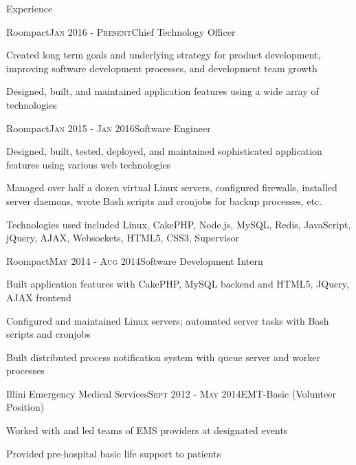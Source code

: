 \documentclass{resume} %
\begin{document}

\begin{rSection}{Experience}
\begin{rSubsection}{Roompact}{\textsc{Jan 2016 - Present}}{Chief Technology Officer}{}
\item Created long term goals and underlying strategy for product development, improving software development processes, and development team growth
\item Designed, built, and maintained application features using a wide array of technologies
\end{rSubsection}


\begin{rSubsection}{Roompact}{\textsc{Jan 2015 - Jan 2016}}{Software Engineer}{}
\item Designed, built, tested, deployed, and maintained sophisticated application features using various web technologies
\item Managed over half a dozen virtual Linux servers, configured firewalls, installed server daemons, wrote Bash scripts and cronjobs for backup processes, etc.
\item Technologies used included Linux, CakePHP, Node.js, MySQL, Redis, JavaScript, jQuery, AJAX, Websockets, HTML5, CSS3, Supervisor
\end{rSubsection}


\begin{rSubsection}{Roompact}{\textsc{May 2014 - Aug 2014}}{Software Development Intern}{}
\item Built application features with CakePHP, MySQL backend and HTML5, JQuery, AJAX frontend
\item Configured and maintained Linux servers; automated server tasks with Bash scripts and cronjobs
\item Built distributed process notification system with queue server and worker processes
\end{rSubsection}


\begin{rSubsection}{Illini Emergency Medical Services}{\textsc{Sept 2012 - May 2014}}{EMT-Basic (Volunteer Position)}{}
\item Worked with and led teams of EMS providers at designated events
\item Provided pre-hospital basic life support to patients
\end{rSubsection}


\end{rSection}
\end{document}
